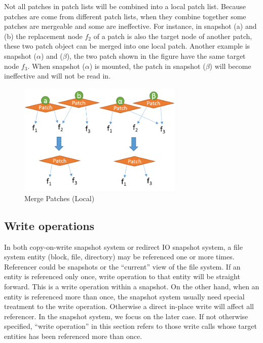     Not all patches in patch lists will be combined into a local patch list. Because patches are come from different patch lists, when they combine together some patches are mergeable and some are ineffective. For instance, in  snapshot (a) and (b) the replacement node $f_2$ of a patch is also the target node of another patch, these two patch object can be merged into one local patch. Another example is snapshot ($\alpha$) and ($\beta$), the two patch shown in the figure have the same target node $f_3$. When snapshot ($\alpha$) is mounted, the patch in snapshot ($\beta$) will become ineffective and will not be read in.

\begin{figure}[hbtp]
\centering
\includegraphics[width=0.7\textwidth]{Chapter-4/figs/fig19.png}
\caption{Merge Patches (Local)}
\label{fig:merge}
\end{figure}

\subsection{Write operations}

    In both copy-on-write snapshot system or redirect IO snapshot system, a file system entity (block, file, directory) may be referenced one or more times. Referencer could be snapshots or the ``current'' view of the file system. If an entity is referenced only once, write operation to that entity will be straight forward. This is a write operation within a snapshot. On the other hand, when an entity is referenced more than once, the snapshot system usually need special treatment to the write operation. Otherwise a direct in-place write will affect all referencer. In the snapshot system, we focus on the later case. If not otherwise specified, ``write operation'' in this section refers to those write calls whose target entities has been referenced more than once.


